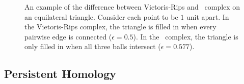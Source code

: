 \begin{figure}
  \centering
  \caption[Vietoris-Rips and \Cech Complexes]{An example of the difference between Vietoris-Rips and \Cech\ complex on an equilateral triangle. Consider each point to be $1$ unit apart. In the Vietoris-Rips complex, the triangle is filled in when every pairwise edge is connected ($\epsilon=0.5$). In the \Cech\ complex, the triangle is only filled in when all three balls intersect ($\epsilon=0.577$).}
  \label{fig:bg:triangle_complexes}
\end{figure}
	
\subsection{Persistent Homology}
\label{bg:tda:ph}

